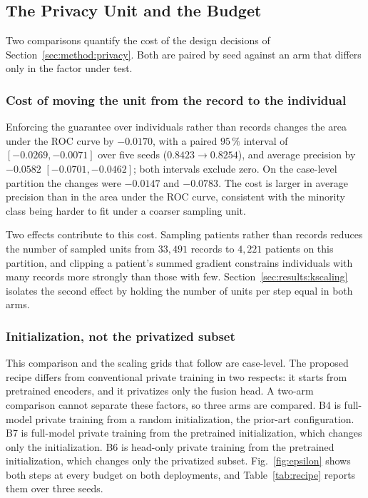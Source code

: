 \subsection{The Privacy Unit and the Budget}
\label{sec:results:unit}

Two comparisons quantify the cost of the design decisions of
Section~\ref{sec:method:privacy}. Both are paired by seed against an arm that
differs only in the factor under test.

\subsubsection{Cost of moving the unit from the record to the individual}
Enforcing the guarantee over individuals rather than records changes the area
under the ROC curve by $-0.0170$, with a paired $95\,\%$ interval of
$[-0.0269, -0.0071]$ over five seeds ($0.8423 \rightarrow 0.8254$), and
average precision by $-0.0582$ $[-0.0701, -0.0462]$; both intervals exclude
zero. On the case-level partition the changes were $-0.0147$ and $-0.0783$. The cost is larger in
average precision than in the area under the ROC curve, consistent with the
minority class being harder to fit under a coarser sampling unit.

Two effects contribute to this cost. Sampling patients rather than records
reduces the number of sampled units from $33{,}491$ records to $4{,}221$
patients on this partition, and clipping a patient's summed gradient constrains
individuals with many records more strongly than those with few.
Section~\ref{sec:results:kscaling} isolates the second effect by holding the
number of units per step equal in both arms.

\subsubsection{Initialization, not the privatized subset}
This comparison and the scaling grids that follow are case-level. The
proposed recipe differs from conventional private training in two
respects: it starts from pretrained encoders, and it privatizes only the
fusion head. A two-arm comparison cannot separate these factors, so three arms
are compared. B4 is full-model private training from a random initialization,
the prior-art configuration. B7 is full-model private training from the
pretrained initialization, which changes only the initialization. B6 is
head-only private training from the pretrained initialization, which changes
only the privatized subset. Fig.~\ref{fig:epsilon} shows both steps at every
budget on both deployments, and Table~\ref{tab:recipe} reports them over
three seeds.

